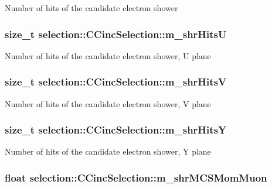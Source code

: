 Number of hits of the candidate electron shower \hypertarget{classselection_1_1CCincSelection_a48423013d7f54f8b67c194534507f643}{
\subsubsection[{m\-\_\-shr\-Hits\-U}]{\setlength{\rightskip}{0pt plus 5cm}size\-\_\-t selection\-::\-C\-Cinc\-Selection\-::m\-\_\-shr\-Hits\-U\hspace{0.3cm}{\ttfamily [private]}}}\label{classselection_1_1CCincSelection_a48423013d7f54f8b67c194534507f643}
Number of hits of the candidate electron shower, U plane \hypertarget{classselection_1_1CCincSelection_a41998992412570fd00dc4e2457525b58}{
\subsubsection[{m\-\_\-shr\-Hits\-V}]{\setlength{\rightskip}{0pt plus 5cm}size\-\_\-t selection\-::\-C\-Cinc\-Selection\-::m\-\_\-shr\-Hits\-V\hspace{0.3cm}{\ttfamily [private]}}}\label{classselection_1_1CCincSelection_a41998992412570fd00dc4e2457525b58}
Number of hits of the candidate electron shower, V plane \hypertarget{classselection_1_1CCincSelection_aebe42543b0965cce015eb2a8412c33d4}{
\subsubsection[{m\-\_\-shr\-Hits\-Y}]{\setlength{\rightskip}{0pt plus 5cm}size\-\_\-t selection\-::\-C\-Cinc\-Selection\-::m\-\_\-shr\-Hits\-Y\hspace{0.3cm}{\ttfamily [private]}}}\label{classselection_1_1CCincSelection_aebe42543b0965cce015eb2a8412c33d4}
Number of hits of the candidate electron shower, Y plane \hypertarget{classselection_1_1CCincSelection_a752b664543c799d4afd1ee195091ff1c}{
\subsubsection[{m\-\_\-shr\-M\-C\-S\-Mom\-Muon}]{\setlength{\rightskip}{0pt plus 5cm}float selection\-::\-C\-Cinc\-Selection\-::m\-\_\-shr\-M\-C\-S\-Mom\-Muon\hspace{0.3cm}{\ttfamily [private]}}}\label{classselection_1_1CCincSelection_a752b664543c799d4afd1ee195091ff1c}
